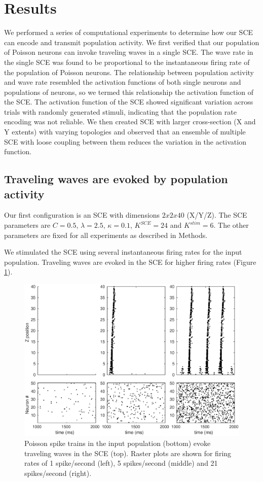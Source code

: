 \documentclass[12pt]{article}
\begin{document}
\section{Results}
We performed a series of computational experiments to determine how our SCE can encode and transmit population activity.
We first verified that our population of Poisson neurons can invoke traveling waves in a single SCE.
The wave rate in the single SCE was found to be proportional to the instantaneous firing rate of the population of Poisson neurons.
The relationship between population activity and wave rate resembled the activation functions of both single neurons and populations of neurons, so we termed this relationship the activation function of the SCE.
The activation function of the SCE showed significant variation across trials with randomly generated stimuli, indicating that the population rate encoding was not reliable.
We then created SCE with larger cross-section (X and Y extents) with varying topologies and observed that an ensemble of multiple SCE with loose coupling between them reduces the variation in the activation function.

\subsection*{Traveling waves are evoked by population activity}
Our first configuration is an SCE with dimensions $2x2x40$ (X/Y/Z).
The SCE parameters are $C=0.5$, $\lambda=2.5$, $\kappa=0.1$, $K^{SCE}=24$ and $K^{stim}=6$.
The other parameters are fixed for all experiments as described in Methods.

We stimulated the SCE using several instantaneous firing rates for the input population.
Traveling waves are evoked in the SCE for higher firing rates (Figure \ref{fig:sce_raster}).

\begin{figure}[!htb]
 \centering
 \includegraphics[width=\textwidth]{fig/SCE_2x2_FRE_rasters}
 \caption{Poisson spike trains in the input population (bottom) evoke traveling waves in the SCE (top). Raster plots are shown for firing rates of 1 spike/second (left), 5 spikes/second (middle) and 21 spikes/second (right).  }
 \label{fig:sce_raster}
\end{figure}
\end{document}
